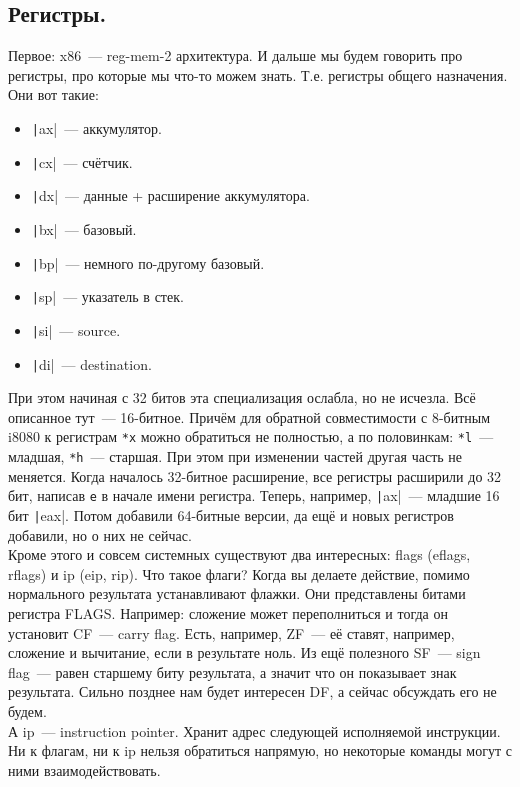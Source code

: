 \documentclass{article}
\begin{document}
    \subsection{Регистры.}\label{par:registers}
    Первое: x86~--- reg-mem-2 архитектура. И дальше мы будем говорить про регистры, про которые мы что-то можем знать. Т.е. регистры общего назначения. Они вот такие:
    \begin{itemize}
        \item \texttt|ax|~--- аккумулятор.
        \item \texttt|cx|~--- счётчик.
        \item \texttt|dx|~--- данные + расширение аккумулятора.
        \item \texttt|bx|~--- базовый.
        \item \texttt|bp|~--- немного по-другому базовый.
        \item \texttt|sp|~--- указатель в стек.
        \item \texttt|si|~--- source.
        \item \texttt|di|~--- destination.
    \end{itemize}
    При этом начиная с 32 битов эта специализация ослабла, но не исчезла. Всё описанное тут~--- 16-битное. Причём для обратной совместимости с 8-битным i8080 к регистрам \Verb|*x| можно обратиться не полностью, а по половинкам: \Verb|*l|~--- младшая, \Verb|*h|~--- старшая. При этом при изменении частей другая часть не меняется. Когда началось 32-битное расширение, все регистры расширили до 32 бит, написав \Verb|e| в начале имени регистра. Теперь, например, \texttt|ax|~--- младшие 16 бит \texttt|eax|. Потом добавили 64-битные версии, да ещё и новых регистров добавили, но о них не сейчас.\\
    Кроме этого и совсем системных существуют два интересных: flags (eflags, rflags) и ip (eip, rip). Что такое флаги? Когда вы делаете действие, помимо нормального результата устанавливают флажки. Они представлены битами регистра FLAGS. Например: сложение может переполниться и тогда он установит CF~--- carry flag. Есть, например, ZF~--- её ставят, например, сложение и вычитание, если в результате ноль. Из ещё полезного SF~--- sign flag~--- равен старшему биту результата, а значит что он показывает знак результата. Сильно позднее нам будет интересен DF, а сейчас обсуждать его не будем.\\
    А ip~--- instruction pointer. Хранит адрес следующей исполняемой инструкции. Ни к флагам, ни к ip нельзя обратиться напрямую, но некоторые команды могут с ними взаимодействовать.
\end{document}
